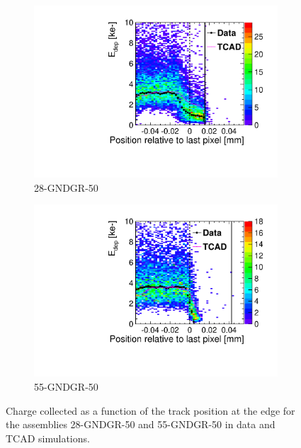\begin{figure}[htbp]
  \begin{subfigure}[b]{0.45\textwidth}
    \centering
    \includegraphics[width=\textwidth]{figures/ActiveEdge/28_GNDGR_Edep_TCAD_data.pdf}
    \caption{28-GNDGR-50}
  \end{subfigure}\hfill
  \begin{subfigure}[b]{0.45\textwidth}
    \centering
    \includegraphics[width=\textwidth]{figures/ActiveEdge/55_GNDGR_Edep_TCAD_data.pdf}
    \caption{55-GNDGR-50}
  \end{subfigure}
  \caption{Charge collected as a function of the track position at the
    edge for the assemblies 28-GNDGR-50 and 55-GNDGR-50 in data and
    TCAD simulations.}
  \label{fig:ChargeCollectionNGRFGR_50}
\end{figure}



